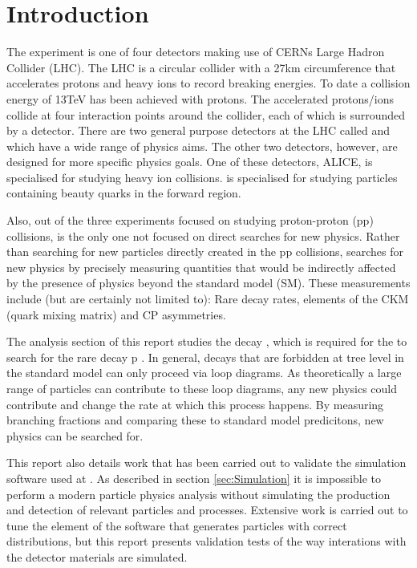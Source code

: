 
\section{Introduction}
\label{sec:Introduction}
The \lhcb experiment is one of four detectors making use of CERNs Large Hadron Collider (LHC). The LHC is a circular collider with a 27km circumference that accelerates protons and heavy ions to record breaking energies.  To date a collision energy of 13TeV has been achieved with protons.  The accelerated protons/ions collide at four interaction points around the collider, each of which is surrounded by a detector.  There are two general purpose detectors at the LHC called \atlas and \cms which have a wide range of physics aims.  The other two detectors, however, are designed for more specific physics goals.  One of these detectors, ALICE, is specialised for studying heavy ion collisions.  \lhcb is specialised for studying particles containing beauty quarks in the forward region.

Also, out of the three experiments focused on studying proton-proton (pp) collisions, \lhcb is the only one not focused on direct searches for new physics.  Rather than searching for new particles directly created in the pp collisions, \lhcb searches for new physics by precisely measuring quantities that would be indirectly affected by the presence of physics beyond the standard model (SM).  These measurements include (but are certainly not limited to): Rare decay rates, elements of the CKM (quark mixing matrix) and CP asymmetries.

The analysis section of this report studies the decay \Bd \to \Kstar \etaz, which is required for the to search for the rare decay \Lb \to p \Km \etaz.  In general, decays that are forbidden at tree level in the standard model can only proceed via loop diagrams.  As theoretically a large range of particles can contribute to these loop diagrams, any new physics could contribute and change the rate at which this process happens.  By measuring branching fractions and comparing these to standard model predicitons, new physics can be searched for.

This report also details work that has been carried out to validate the simulation software used at \lhcb. As described in section \ref{sec:Simulation} it is impossible to perform a modern particle physics analysis without simulating the production and detection of relevant particles and processes.  Extensive work is carried out to tune the element of the software that generates particles with correct distributions, but this report presents validation tests of the way interations with the detector materials are simulated.





